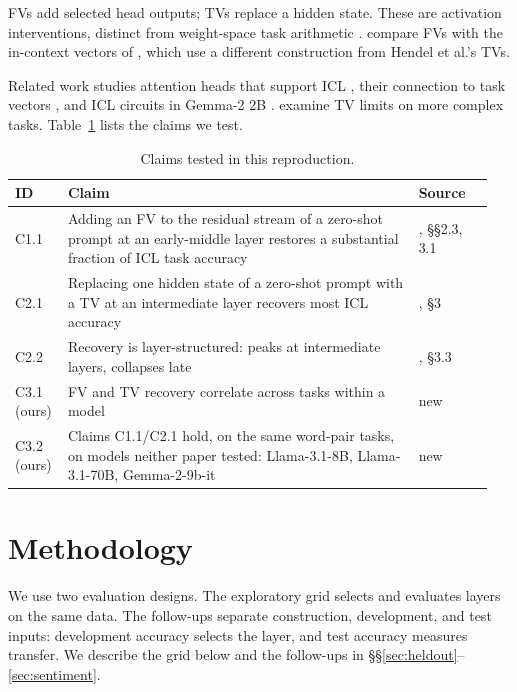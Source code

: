 \documentclass[11pt]{article}
\begin{document}
FVs add selected head outputs; TVs replace a hidden state. These are activation interventions, distinct from weight-space task arithmetic \citep{ilharco2023editing}. \citet{brumley2024comparing} compare FVs with the in-context vectors of \citet{liu2024incontext}, which use a different construction from Hendel et al.'s TVs.

Related work studies attention heads that support ICL \citep{yin2025which}, their connection to task vectors \citep{yang2025unifying}, and ICL circuits in Gemma-2 2B \citep{bakalova2025contextualize}. \citet{tikhonov2026one} examine TV limits on more complex tasks. Table~\ref{tab:claims} lists the claims we test.

\begin{table}[t]
  \centering
  \small
  \setlength{\tabcolsep}{3pt}
  \begin{tabular}{p{0.10\linewidth}p{0.70\linewidth}p{0.15\linewidth}}
    \toprule
    \textbf{ID} & \textbf{Claim} & \textbf{Source} \\
    \midrule
    C1.1 & Adding an FV to the residual stream of a zero-shot prompt at an early-middle layer restores a substantial fraction of ICL task accuracy & \citet{todd2024function}, \S\S2.3, 3.1 \\
    C2.1 & Replacing one hidden state of a zero-shot prompt with a TV at an intermediate layer recovers most ICL accuracy & \citet{hendel2023incontext}, \S3 \\
    C2.2 & Recovery is layer-structured: peaks at intermediate layers, collapses late & \citet{hendel2023incontext}, \S3.3 \\
    C3.1 (ours) & FV and TV recovery correlate across tasks within a model & new \\
    C3.2 (ours) & Claims C1.1/C2.1 hold, on the same word-pair tasks, on models neither paper tested: Llama-3.1-8B, Llama-3.1-70B, Gemma-2-9b-it & new \\
    \bottomrule
  \end{tabular}
  \caption{Claims tested in this reproduction.}
  \label{tab:claims}
\end{table}

\section{Methodology}
\label{sec:method}

We use two evaluation designs. The exploratory grid selects and evaluates layers on the same data. The follow-ups separate construction, development, and test inputs: development accuracy selects the layer, and test accuracy measures transfer. We describe the grid below and the follow-ups in \S\S\ref{sec:heldout}--\ref{sec:sentiment}.
\end{document}
